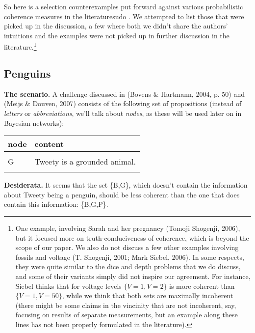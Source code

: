 \documentclass[10pt,]{scrartcl}
\newcommand{\s}[1]{\mbox{\textsf{#1}}}
\begin{document}
So here is a selection counterexamples put forward against various
probabilistic coherence measures in the literaturesudo . We attempted to
list those that were picked up in the discussion, a few where both we
didn't share the authors' intuitions and the examples were not picked up
in further discussion in the literature.\footnote{One example, involving
  Sarah and her pregnancy (Tomoji Shogenji, 2006), but it focused more
  on truth-conduciveness of coherence, which is beyond the scope of our
  paper. We also do not discuss a few other examples involving fossils
  and voltage (T. Shogenji, 2001; Mark Siebel, 2006). In some respects,
  they were quite similar to the dice and depth problems that we do
  discuss, and some of their variants simply did not inspire our
  agreement. For instance, Siebel thinks that for voltage levels
  \(\{V=1, V=2\}\) is more coherent than \(\{V=1, V=50\}\), while we
  think that both sets are maximally incoherent (there might be some
  claims in the vincinity that are not incoherent, say, focusing on
  results of separate measurements, but an example along these lines has
  not been properly formulated in the literature).}

\subsection{Penguins}

\textbf{The scenario.} A challenge discussed in (Bovens \& Hartmann,
2004, p. 50) and (Meijs \& Douven, 2007) consists of the following set
of propositions (instead of \emph{letters} or \emph{abbreviations},
we'll talk about \emph{nodes}, as these will be used later on in
Bayesian networks):

\begin{table}[H]
\centering
\begin{tabular}{ll}
\toprule
node & content\\
\midrule
\cellcolor{gray!6}{B} & \cellcolor{gray!6}{Tweety is a bird.}\\
G & Tweety is a grounded animal.\\
\cellcolor{gray!6}{P} & \cellcolor{gray!6}{Tweety is a penguin.}\\
\bottomrule
\end{tabular}
\end{table}

\noindent \textbf{Desiderata.} It seems that the set \{\s{B},\s{G}\},
which doesn't contain the information about Tweety being a penguin,
should be less coherent than the one that does contain this information:
\{\s{B},\s{G},\s{P}\}.
\end{document}
